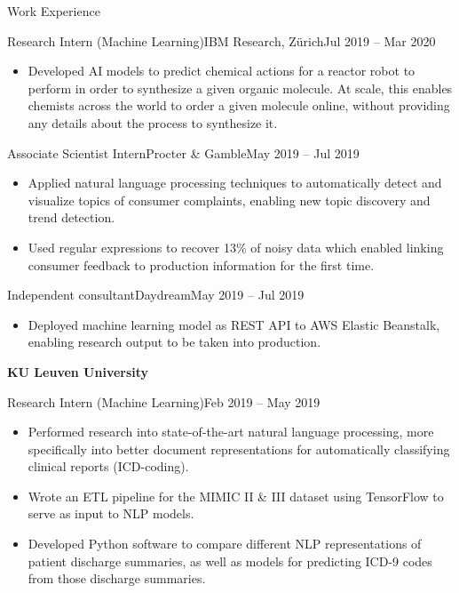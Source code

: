 \documentclass[]{mcdowellcv}
\begin{document}
\begin{cvsection}{Work Experience}
	\begin{cvsubsection}{Research Intern (Machine Learning)}{IBM Research, Z\"urich}{Jul 2019 -- Mar 2020}
		\begin{itemize}
			\item Developed AI models to predict chemical actions for a reactor robot to perform in order to synthesize a given organic molecule. At scale, this enables chemists across the world to order a given molecule online, without providing any details about the process to synthesize it.
		\end{itemize}
	\end{cvsubsection}
	\begin{cvsubsection}{Associate Scientist Intern}{Procter \& Gamble}{May 2019 -- Jul 2019}
		\begin{itemize}
			\item Applied natural language processing techniques to automatically detect and visualize topics of consumer complaints, enabling new topic discovery and trend detection.
			\item Used regular expressions to recover 13\% of noisy data which enabled linking consumer feedback to production information for the first time.
		\end{itemize}
	\end{cvsubsection}
	\begin{cvsubsection}{Independent consultant}{Daydream}{May 2019 -- Jul 2019}
		\begin{itemize}
			\item Deployed machine learning model as REST API to AWS Elastic Beanstalk, enabling research output to be taken into production.
		\end{itemize}
	\end{cvsubsection}
	\centering\textbf{KU Leuven University}
	\begin{cvsubsection}{Research Intern (Machine Learning)}{}{Feb 2019 -- May 2019}
		\begin{itemize}%
			\item Performed research into state-of-the-art natural language processing, more specifically into better document representations for automatically classifying clinical reports (ICD-coding). 
			\item Wrote an ETL pipeline for the MIMIC II \& III dataset using TensorFlow to serve as input to NLP models.
			\item Developed Python software to compare different NLP representations of patient discharge summaries, as well as models for predicting ICD-9 codes from those discharge summaries.

\end{itemize}
\end{cvsubsection}
\end{cvsection}
\end{document}

